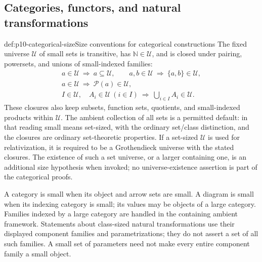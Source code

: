 
\subsection{Categories, functors, and natural transformations}
\label{sec:p10-categorical-toolkit}

\begin{hbconvention}{def:p10-categorical-size}{Size conventions for categorical constructions}
The fixed universe \(\mathcal U\) of small sets is transitive,
has \(\mathbb N\in\mathcal U\), and is closed under pairing, powersets,
and unions of small-indexed families:
\[
 \begin{gathered}
 a\in\mathcal U\ \Longrightarrow\ a\subseteq\mathcal U,\qquad
 a,b\in\mathcal U\ \Longrightarrow\ \{a,b\}\in\mathcal U,\\
 a\in\mathcal U\ \Longrightarrow\ \mathcal P(a)\in\mathcal U,\\
 I\in\mathcal U,\quad A_i\in\mathcal U\ (i\in I)
       \ \Longrightarrow\ \bigcup_{i\in I}A_i\in\mathcal U .
 \end{gathered}
\]
These closures also keep subsets, function sets, quotients, and
small-indexed products within \(\mathcal U\).
The ambient collection of all sets is a permitted default:
in that reading small means set-sized, with the ordinary
set/class distinction, and the closures are ordinary set-theoretic
properties.  If a set-sized \(\mathcal U\) is used for relativization,
it is required to be a Grothendieck universe with the stated
closures.  The existence of such a set universe, or a larger
containing one, is an additional size hypothesis when invoked;
no universe-existence assertion is part of the categorical proofs.

A category is small when its object and arrow sets are small.
A diagram is small when its indexing category is small; its
values may be objects of a large category.
Families indexed by a large category are handled in the containing
ambient framework.  Statements about class-sized natural
transformations use their displayed component families and
parametrizations; they do not assert a set of all such families.
A small set of parameters need not make every entire component
family a small object.
\end{hbconvention}

